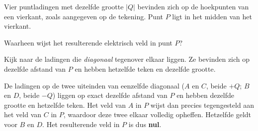 \documentclass{ximera}
\begin{document}
\begin{question}
    Vier puntladingen met dezelfde grootte $|Q|$ bevinden zich op de hoekpunten van een vierkant, zoals aangegeven op de tekening. Punt $P$ ligt in het midden van het vierkant.

    \begin{center}
    \end{center}

    Waarheen wijst het resulterende elektrisch veld in punt $P$?

    \begin{multipleChoice}
    \end{multipleChoice}

    \begin{hint}
        Kijk naar de ladingen die \emph{diagonaal} tegenover elkaar liggen. Ze bevinden zich op dezelfde afstand van $P$ en hebben hetzelfde teken en dezelfde grootte.
    \end{hint}

    \begin{solution}\nl
        De ladingen op de twee uiteinden van eenzelfde diagonaal ($A$ en $C$, beide $+Q$; $B$ en $D$, beide $-Q$) liggen op exact dezelfde afstand van $P$ en hebben dezelfde grootte en hetzelfde teken. Het veld van $A$ in $P$ wijst dan precies tegengesteld aan het veld van $C$ in $P$, waardoor deze twee elkaar volledig opheffen. Hetzelfde geldt voor $B$ en $D$. Het resulterende veld in $P$ is dus \textbf{nul}.
    \end{solution}
\end{question}
\end{document}
